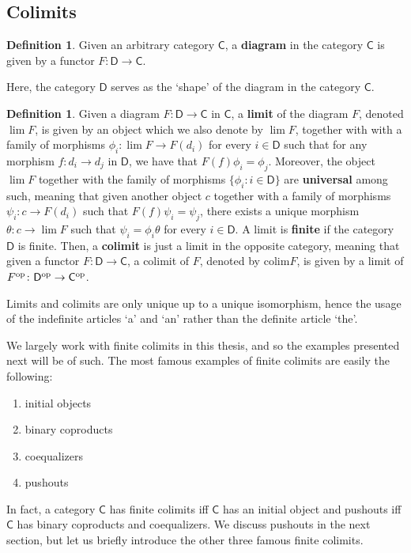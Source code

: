 \documentclass[oneside,final]{ucr}
\theoremstyle{definition}
\newtheorem{definition}[theorem]{Definition}
\newcommand{\colim}{\mathrm{colim}}
\newcommand{\define}[1]{{\bf \boldmath #1}}
\begin{document}
{\subsection{Colimits}

\begin{definition}
Given an arbitrary category $\mathsf{C}$, a \define{diagram} in the category $\mathsf{C}$ is given by a functor $F \colon \mathsf{D} \to \mathsf{C}$.
\end{definition}
Here, the category $\mathsf{D}$ serves as the `shape' of the diagram in the category $\mathsf{C}$. 

\begin{definition}
Given a diagram $F \colon \mathsf{D} \to \mathsf{C}$ in $\mathsf{C}$, a \define{limit} of the diagram $F$, denoted $\lim F$, is given by an object which we also denote by $\lim F$, together with with a family of morphisms $\phi_i \colon \lim F \to F(d_i)$ for every $i \in \mathsf{D}$ such that for any morphism $f \colon d_i \to d_j$ in $\mathsf{D}$, we have that $F(f) \phi_i = \phi_j$. Moreover, the object $\lim F$ together with the family of morphisms $\{ \phi_i \colon i \in \mathsf{D} \}$ are \define{universal} among such, meaning that given another object $c$ together with a family of morphisms $\psi_i \colon c \to F(d_i)$ such that $F(f) \psi_i = \psi_j$, there exists a unique morphism $\theta \colon c \to \lim F$ such that $\psi_i =  \phi_i \theta$ for every $i \in \mathsf{D}$. A limit is \define{finite} if the category $\mathsf{D}$ is finite. Then, a \define{colimit} is just a limit in the opposite category, meaning that given a functor $F \colon \mathsf{D} \to \mathsf{C}$, a colimit of $F$, denoted by $\colim F$, is given by a limit of $F^\textnormal{op} \colon \mathsf{D}^\textnormal{op} \to \mathsf{C}^\textnormal{op}$.
\end{definition}
Limits and colimits are only unique up to a unique isomorphism, hence the usage of the indefinite articles `a' and `an' rather than the definite article `the'.

We largely work with finite colimits in this thesis, and so the examples presented next will be of such. The most famous examples of finite colimits are easily the following:
\begin{enumerate}
\item{initial objects}
\item{binary coproducts}
\item{coequalizers}
\item{pushouts}
\end{enumerate}
In fact, a category $\mathsf{C}$ has finite colimits iff $\mathsf{C}$ has an initial object and pushouts iff $\mathsf{C}$ has binary coproducts and coequalizers. We discuss pushouts in the next section, but let us briefly introduce the other three famous finite colimits.

}
\end{document}
